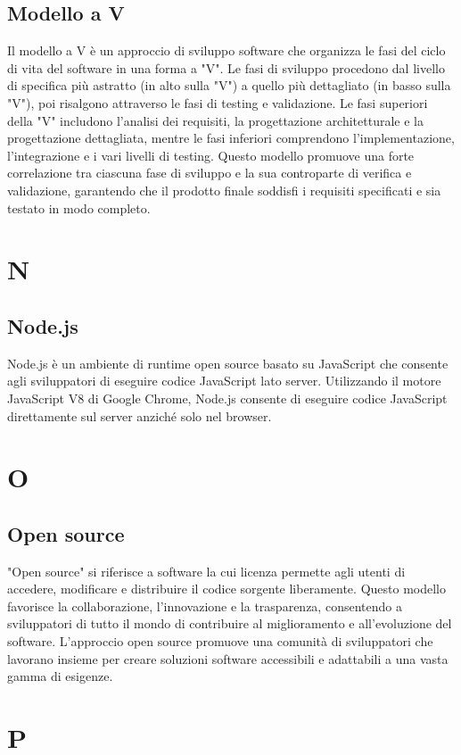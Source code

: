 \documentclass{article}
\begin{document}
\subsection{Modello a V}
Il modello a V è un approccio di sviluppo software che organizza le fasi del ciclo di vita del software in una forma a "V". Le fasi di sviluppo procedono dal livello di specifica più astratto (in alto sulla "V") a quello più dettagliato (in basso sulla "V"), poi risalgono attraverso le fasi di testing e validazione. Le fasi superiori della "V" includono l'analisi dei requisiti, la progettazione architetturale e la progettazione dettagliata, mentre le fasi inferiori comprendono l'implementazione, l'integrazione e i vari livelli di testing. Questo modello promuove una forte correlazione tra ciascuna fase di sviluppo e la sua controparte di verifica e validazione, garantendo che il prodotto finale soddisfi i requisiti specificati e sia testato in modo completo.

\section{N}
\subsection{Node.js}
Node.js è un ambiente di runtime open source basato su JavaScript che consente agli sviluppatori di eseguire codice JavaScript lato server. Utilizzando il motore JavaScript V8 di Google Chrome, Node.js consente di eseguire codice JavaScript direttamente sul server anziché solo nel browser.

\section{O}
\subsection{Open source}
"Open source" si riferisce a software la cui licenza permette agli utenti di accedere, modificare e distribuire il codice sorgente liberamente. Questo modello favorisce la collaborazione, l'innovazione e la trasparenza, consentendo a sviluppatori di tutto il mondo di contribuire al miglioramento e all'evoluzione del software. L'approccio open source promuove una comunità di sviluppatori che lavorano insieme per creare soluzioni software accessibili e adattabili a una vasta gamma di esigenze.

\section{P}
\end{document}
